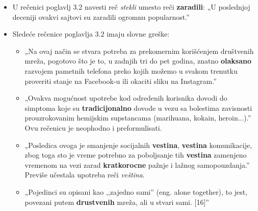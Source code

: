 \documentclass[a4paper]{report}
\newcommand{\odgovor}[1]{\textcolor{blue}{#1}}
\begin{document}
\begin{itemize}
    \item U rečenici poglavlj 3.2 navesti reč \textit{stekli} umesto reči \textbf{zaradili}: \newline
    „U poslednjoj deceniji ovakvi sajtovi su zaradili ogromnu popularnost.”
    
    \odgovor{}
    
\end{itemize}
\begin{itemize}
    \item Sledeće rečenice poglavlja 3.2 imaju slovne greške: \newline
    \begin{itemize}
        \item  „Na ovaj način se stvara potreba za prekomernim korišćenjem društvenih mreža, pogotovo što je to, u zadnjih tri do pet godina, znatno \textbf{olaksano} razvojem pametnih telefona preko kojih možemo u svakom trenutku proveriti stanje na Facebook-u ili okaciti sliku na Instagram.”
        
        \odgovor{}
        
        
    \end{itemize}
    \begin{itemize}
        \item „Ovakva mogućnost upotrebe kod odredenih korisnika dovodi do simptoma koje su \textbf{tradicijonalno} dovode u vezu sa bolestima zavisnosti prouzrokovanim hemijskim supstancama (marihuana, kokain, heroin...).” \newline
        Ovu rečenicu je neophodno i preformulisati.
        
        \odgovor{}
        
    \end{itemize}
    \begin{itemize}
        \item „Posledica ovoga je smanjenje socijalnih \textbf{vestina}, \textbf{vestina} komunikacije, zbog toga sto je vreme potrebno za poboljsanje tih \textbf{vestina} zamenjeno vremenom na vezi zarad \textbf{kratkorocne} pažnje i lažnog samopouzdanja.”\newline
        Previše učestala upotreba reči \textit{veština}.
        
        \odgovor{}
        
    \end{itemize}
    \begin{itemize}
        \item  „Pojedinci su opisani kao ,,zajedno sami” (eng. alone together), to jest, povezani putem \textbf{drustvenih} mreža, ali u stvari sami. [16]”
        

\end{itemize}
\end{itemize}
\end{document}
